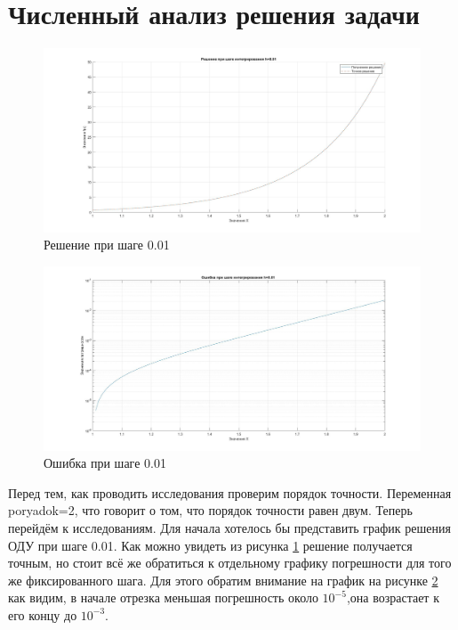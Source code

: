 \documentclass[a4paper]{article}
\begin{document}
\newpage
\section{Численный анализ решения задачи}

\begin{figure}[h!]
\begin{center}
\includegraphics[scale=0.3]{решение при шаге 0.01.jpg} 
\end{center}
\caption{Решение при шаге 0.01} \label{Рис3}
\end{figure}

\begin{figure}[h!]
\begin{center}
\includegraphics[scale=0.3]{ошибка при шаге 0.01.jpg} 
\end{center}
\caption{Ошибка при шаге 0.01} \label{Рис4}
\end{figure}
Перед тем, как проводить исследования проверим порядок точности. Переменная poryadok=2, что говорит о том, что порядок точности равен двум. Теперь перейдём к исследованиям.
Для начала хотелось бы представить график решения ОДУ при шаге 0.01. Как можно увидеть из рисунка \ref{Рис3} решение получается точным, но стоит всё же обратиться к отдельному графику погрешности для того же фиксированного шага. Для этого обратим внимание на график на рисунке \ref{Рис4} как видим, в начале отрезка меньшая погрешность около $10^{-5}$,она возрастает к его концу до $10^{-3}$.
\end{document}

